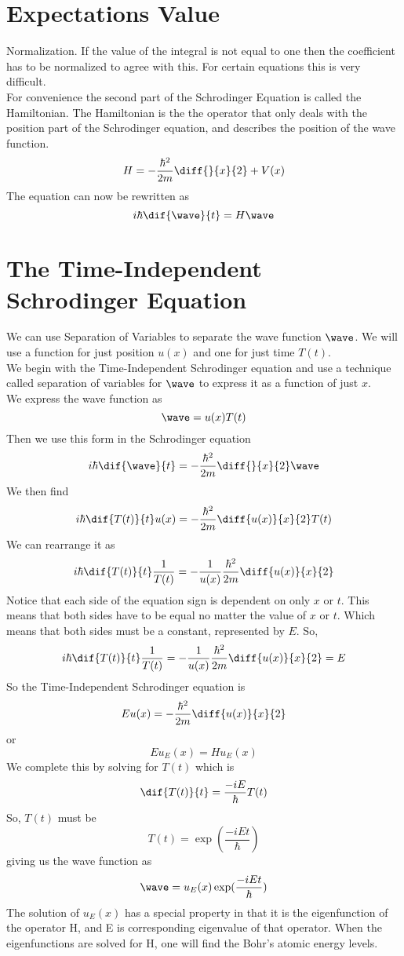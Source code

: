 \section{Expectations Value}
Normalization. If the value of the integral is not equal to one then the coefficient has to be normalized to agree with this. For certain equations this is very difficult. \\
For convenience the second part of the Schrodinger Equation is called the Hamiltonian. The Hamiltonian is the the operator that only deals with the position part of the Schrodinger equation, and describes the position of the wave function. 
$$ H = -\frac{\hbar^2}{2m} \diff{}{x}{2}  + V(x) $$
The equation can now be rewritten as 
\[ i\hbar \dif{\wave}{t} = H \wave \]
\section{The Time-Independent Schrodinger Equation}
We can use Separation of Variables to separate the wave function $ \wave $. We will use a function for just position $ u(x)  $ and one for just time $ T(t) $. \\
We begin with the Time-Independent Schrodinger equation and use a technique called separation of variables for $ \wave $ to express it as a function of just $ x $. \\
We express the wave function as
\[ \wave = u(x)T(t) \]
Then we use this form in the Schrodinger equation
\[ i\hbar \dif{\wave}{t} = -\frac{\hbar^2}{2m} \diff{}{x}{2} \wave \]
We then find
\[ i\hbar \dif{T(t)}{t} u(x) = -\frac{\hbar^2}{2m} \diff{u(x)}{x}{2} T(t)\]
We can rearrange it as
\[ i\hbar \dif{T(t)}{t} \frac{1}{T(t)} = -\frac{1}{u(x)}\frac{\hbar^2}{2m} \diff{u(x)}{x}{2} \]
Notice that each side of the equation sign is dependent on only $ x $ or $ t $. This means that both sides have to be equal no matter the value of $ x $ or $ t $. Which means that both sides must be a constant, represented by $ E $. So, 
\[ i\hbar \dif{T(t)}{t} \frac{1}{T(t)} = -\frac{1}{u(x)}\frac{\hbar^2}{2m} \diff{u(x)}{x}{2} = E\]
So the Time-Independent Schrodinger equation is 
\[ Eu(x) =  -\frac{\hbar^2}{2m} \diff{u(x)}{x}{2}\]
or
\[ Eu_E(x) = Hu_E(x) \]
We complete this by solving for $ T(t) $ which is 
\[ \dif{T(t)}{t} = \frac{-i E}{\hbar} T(t) \]
So, $ T(t) $ must be
\[ T(t) = \exp(\frac{-iEt}{\hbar}) \]
giving us the wave function as
\[ \wave = u_E(x) \exp(\frac{-iEt}{\hbar}) \]
The solution of $ u_E(x) $ has a special property in that it is the eigenfunction of the operator H, and E is corresponding eigenvalue of that operator. When the eigenfunctions are solved for H, one will find the Bohr's atomic energy levels. 
